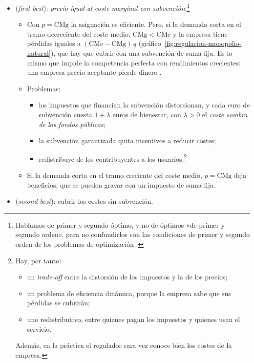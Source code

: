 \documentclass[11pt]{article}
\begin{document}
\begin{itemize}
\item {} (\emph{first best}): \emph{precio igual al coste marginal con subvención}.\footnote{Hablamos de primer y segundo óptimo, y no de óptimos «de primer y segundo orden», para no confundirlos con las condiciones de primer y segundo orden de los problemas de optimización .}
  \begin{itemize}
  \item Con $p=\mathrm{CMg}$ la asignación es eficiente\nocite{Hotelling1938General}. Pero, si la demanda corta en el tramo decreciente del coste medio, $\mathrm{CMg}<\mathrm{CMe}$ y la empresa tiene pérdidas iguales a $(\mathrm{CMe}-\mathrm{CMg})\,q$ (gráfico~\ref{fig:regulacion-monopolio-natural}), que hay que cubrir con una subvención de suma fija. Es lo mismo que impide la competencia perfecta con rendimientos crecientes: una empresa precio-aceptante pierde dinero .
  \item Problemas:
    \begin{itemize}
    \item los impuestos que financian la subvención distorsionan, y cada euro de subvención cuesta $1+\lambda$ euros de bienestar, con $\lambda>0$ el \emph{coste sombra de los fondos públicos};
    \item la subvención garantizada quita incentivos a reducir costes;
    \item redistribuye de los contribuyentes a los usuarios.\footnote{Hay, por tanto:
\begin{itemize}
\item un \emph{trade-off} entre la distorsión de los impuestos y la de los precios;
\item un problema de eficiencia dinámica, porque la empresa sabe que sus pérdidas se cubrirán;
\item uno redistributivo, entre quienes pagan los impuestos y quienes usan el servicio.
\end{itemize}
Además, en la práctica el regulador rara vez conoce bien los costes de la empresa.}
    \end{itemize}
  \item Si la demanda corta en el tramo creciente del coste medio, $p=\mathrm{CMg}$ deja beneficios, que se pueden gravar con un impuesto de suma fija.
  \end{itemize}
\item {} (\emph{second best}): cubrir los costes sin subvención.

\end{itemize}
\end{document}
